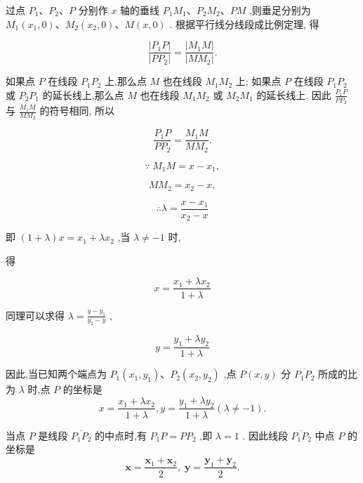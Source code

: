 \documentclass[lang=cn,newtx,10.5pt,scheme=chinese]{elegantbook}
\begin{document}
过点 \({P}_{1}\text{、}{P}_{2}\text{、}P\) 分别作 \(x\) 轴的垂线 \({P}_{1}{M}_{1}\text{、}{P}_{2}{M}_{2}\text{、}{PM}\) ,则垂足分别为 \({M}_{1}\left( {{x}_{1},0}\right) \text{、}{M}_{2}\left( {{x}_{2},0}\right) \text{、}M\left( {x,0}\right)\) . 根据平行线分线段成比例定理, 得

\[
  \frac{\left| {P}_{1}P\right| }{\left| P{P}_{2}\right| } = \frac{\left| {M}_{1}M\right| }{\left| M{M}_{2}\right| }.
\]

如果点 \(P\) 在线段 \({P}_{1}{P}_{2}\) 上,那么点 \(M\) 也在线段 \({M}_{1}{M}_{2}\) 上; 如果点 \(P\) 在线段 \({P}_{1}{P}_{2}\) 或 \({P}_{2}{P}_{1}\) 的延长线上,那么点 \(M\) 也在线段 \({M}_{1}{M}_{2}\) 或 \({M}_{2}{M}_{1}\) 的延长线上. 因此 \(\frac{{P}_{1}P}{P{P}_{2}}\) 与 \(\frac{{M}_{1}M}{M{M}_{2}}\) 的符号相同, 所以

\[
  \frac{{P}_{1}P}{P{P}_{2}} = \frac{{M}_{1}M}{M{M}_{2}}.
\]

\[
  \because \;{M}_{1}M = x - {x}_{1},
\]

\[
  M{M}_{2} = {x}_{2} - x,
\]

\[
  \therefore \lambda = \frac{x - {x}_{1}}{{x}_{2} - x}
\]

即 \(\left( {1 + \lambda }\right) x = {x}_{1} + \lambda {x}_{2}\) ,当 \(\lambda \neq - 1\) 时,

得

\[
  x = \frac{{x}_{1} + \lambda {x}_{2}}{1 + \lambda }
\]

同理可以求得 \(\lambda = \frac{y - {y}_{1}}{{y}_{2} - y}\) ,

\[
  y = \frac{{y}_{1} + \lambda {y}_{2}}{1 + \lambda }
\]

\begin{corollary}[定比分点的坐标]

因此,当已知两个端点为 \({P}_{1}\left( {{x}_{1},{y}_{1}}\right) \text{、}{P}_{2}\left( {{x}_{2},{y}_{2}}\right)\) ,点 \(P\left( {x,y}\right)\) 分 \(\overline{{P}_{1}{P}_{2}}\) 所成的比为 \(\lambda\) 时,点 \(P\) 的坐标是
\[
  x = \frac{{x}_{1} + \lambda {x}_{2}}{1 + \lambda },y = \frac{{y}_{1} + \lambda {y}_{2}}{1 + \lambda }\left( {\lambda \neq - 1}\right) .
\]
\end{corollary}

\begin{corollary}[中点的坐标]

当点 \(P\) 是线段 \(\overline{{P}_{1}{P}_{2}}\) 的中点时,有 \({P}_{1}P = P{P}_{2}\) ,即 \(\lambda = 1\) . 因此线段 \(\overline{{P}_{1}{P}_{2}}\) 中点 \(P\) 的坐标是
\[
\mathbf{x} = \frac{{\mathbf{x}}_{1} + {\mathbf{x}}_{2}}{2},\;\mathbf{y} = \frac{{\mathbf{y}}_{1} + {\mathbf{y}}_{2}}{2}.
\]
\end{corollary}
\end{document}
